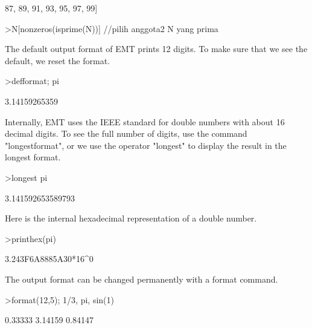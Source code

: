 \documentclass{article}
\begin{document}
\begin{eulernotebook}
\begin{euleroutput}
  87,  89,  91,  93,  95,  97,  99]
\end{euleroutput}
\begin{eulerprompt}
>N[nonzeros(isprime(N))] //pilih anggota2 N yang prima
\end{eulerprompt}
\begin{euleroutput}
  [2,  3,  5,  7,  11,  13,  17,  19,  23,  29,  31,  37,  41,  43,  47,
  53,  59,  61,  67,  71,  73,  79,  83,  89,  97]
\end{euleroutput}
\begin{eulercomment}
The default output format of EMT prints 12 digits. To make sure that
we see the default, we reset the format.
\end{eulercomment}
\begin{eulerprompt}
>defformat; pi
\end{eulerprompt}
\begin{euleroutput}
  3.14159265359
\end{euleroutput}
\begin{eulercomment}
Internally, EMT uses the IEEE standard for double numbers with about 16
decimal digits. To see the full number of digits, use the command
"longestformat", or we use the operator "longest" to display the result in
the longest format.
\end{eulercomment}
\begin{eulerprompt}
>longest pi
\end{eulerprompt}
\begin{euleroutput}
        3.141592653589793 
\end{euleroutput}
\begin{eulercomment}
Here is the internal hexadecimal representation of a double number.
\end{eulercomment}
\begin{eulerprompt}
>printhex(pi)
\end{eulerprompt}
\begin{euleroutput}
  3.243F6A8885A30*16^0
\end{euleroutput}
\begin{eulercomment}
The output format can be changed permanently with a format command.
\end{eulercomment}
\begin{eulerprompt}
>format(12,5); 1/3, pi, sin(1)
\end{eulerprompt}
\begin{euleroutput}
      0.33333 
      3.14159 
      0.84147 
\end{euleroutput}

\end{eulernotebook}
\end{document}
